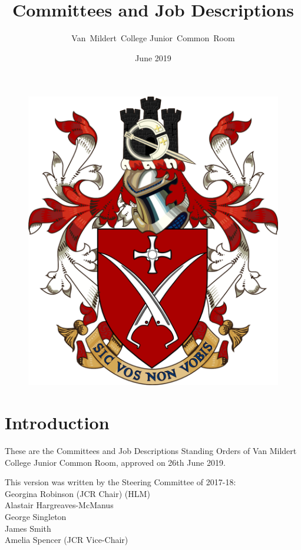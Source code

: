 \documentclass[12pt]{article}  %
\title{Committees and Job Descriptions}
\author{Van~Mildert~College Junior~Common~Room}
\date{June 2019}
\begin{document}
\begin{titlepage}  %
\maketitle
\begin{figure}[h]
\includegraphics[scale=0.25]{arms}  %
\centering
\end{figure}
\thispagestyle{empty}
\end{titlepage}

\setcounter{page}{2}  %
\section*{Introduction}
These are the Committees and Job Descriptions Standing Orders of Van Mildert College Junior Common Room, approved on 26th June 2019.

This version was written by the Steering Committee of 2017-18:\\
\hspace*{2cm}Georgina Robinson (JCR Chair) (HLM)\\
\hspace*{2cm}Alastair Hargreaves-McManus\\
\hspace*{2cm}George Singleton\\
\hspace*{2cm}James Smith\\
\hspace*{2cm}Amelia Spencer (JCR Vice-Chair)
\end{document}
